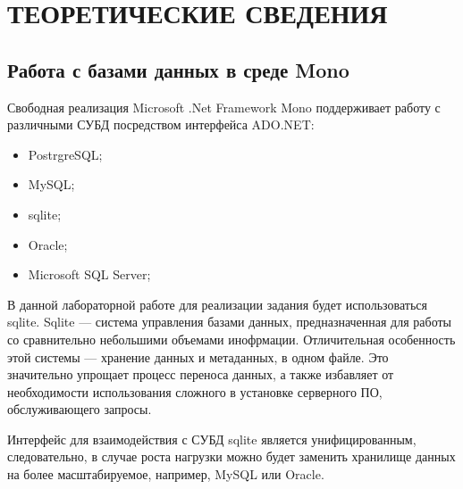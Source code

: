 \section{ТЕОРЕТИЧЕСКИЕ СВЕДЕНИЯ}

\subsection{Работа с базами данных в среде Mono}

Свободная реализация Microsoft .Net Framework Mono поддерживает 
работу с различными СУБД посредством интерфейса ADO.NET:
\begin{itemize}
  \item PostrgreSQL;
  \item MySQL;
  \item sqlite;
  \item Oracle;
  \item Microsoft SQL Server;
\end{itemize}

В данной лабораторной работе для реализации задания будет использоваться sqlite.
Sqlite --- система управления базами данных, предназначенная для работы
со сравнительно небольшими объемами инофрмации. 
Отличительная особенность этой системы --- хранение данных и метаданных,
в одном файле. Это значительно упрощает процесс переноса данных, а также 
избавляет от необходимости использования сложного в установке серверного ПО,
обслуживающего запросы.

Интерфейс для взаимодействия с СУБД sqlite является унифицированным,
следовательно, в случае роста нагрузки можно будет заменить хранилище 
данных на более масштабируемое, например, MySQL или Oracle.
